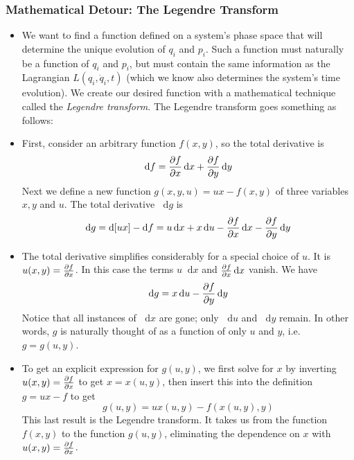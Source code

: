\documentclass[11pt, a4paper]{article}
\newcommand{\diff}{\mathop{}\!\mathrm{d}} %
\begin{document}
\subsubsection{Mathematical Detour: The Legendre Transform}
\begin{itemize}
	\item We want to find a function defined on a system's phase space that will determine the unique evolution of $ q_{i} $ and $ p_{i} $. Such a function must naturally be a function of $ q_{i} $ and $ p_{i} $, but must contain the same information as the Lagrangian $ L(q_{i}, \dot{q}_{i}, t) $ (which we know also determines the system's time evolution). We create our desired function with a mathematical technique called the \textit{Legendre transform}. The Legendre transform goes something as follows:
	
	\item First, consider an arbitrary function $ f(x, y) $, so the total derivative is
	\begin{equation*}
		\diff f = \pdv{f}{x} \diff x + \pdv{f}{y} \diff y
	\end{equation*}
	Next we define a new function $ g(x, y, u) = ux - f(x, y)$ of three variables $ x, y $ and $ u $. The total derivative $ \diff g $ is
	\begin{equation*}
		\diff g = \diff [ux] - \diff f = u \diff x + x \diff u - \pdv{f}{x} \diff x - \pdv{f}{y} \diff y
	\end{equation*}
	
	\item The total derivative simplifies considerably for a special choice of $ u $. It is $ u(x, y) = \pdv{f}{x}$. In this case the terms $ u \diff x  $ and $ \pdv{f}{x} \diff x $ vanish. We have
	\begin{equation*}
		\diff g = x \diff u - \pdv{f}{y}\diff y
	\end{equation*}
	Notice that all instances of $ \diff x $ are gone; only $ \diff u $ and $ \diff y $ remain. In other words, $ g $ is naturally thought of as a function of only $ u $ and $ y $, i.e. $ g = g(u, y) $.
	
	\item To get an explicit expression for $ g(u, y) $, we first solve for $ x $ by inverting $ u(x, y) = \pdv{f}{x} $ to get $ x = x(u, y) $, then insert this into the definition $ g = ux - f $ to get
	\begin{equation*}
		g(u, y) = u x(u, y) - f(x(u, y), y)
	\end{equation*}
	This last result is the Legendre transform. It takes us from the function $ f(x, y) $ to the function $ g(u, y) $, eliminating the dependence on $ x $ with $ u(x, y) = \pdv{f}{x} $. 
	

\end{itemize}
\end{document}
